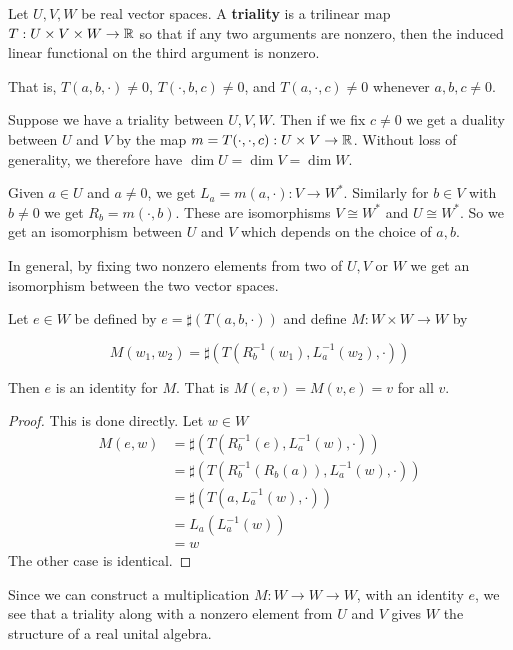 \begin{defn}[Triality]
    Let $U,V,W$ be real vector spaces. A \textbf{triality} is a trilinear map $T : U\times V\times W \to \operatorname{\mathbb{R}}$ so that if any two arguments are nonzero, then the induced linear functional on the third argument is nonzero.

    That is, $T(a,b,\cdot)\neq 0$, $T(\cdot,b,c)\neq 0$, and $T(a,\cdot,c)\neq 0$ whenever $a,b,c\neq 0$.
\end{defn}
\begin{remark*}
    Suppose we have a triality between $U,V,W$. Then if we fix $c\neq 0$ we get a duality between $U$ and $V$ by the map $m = T(\cdot,\cdot,c) : U\times V \to \operatorname{\mathbb{R}}$. Without loss of generality, we therefore have $\dim U = \dim V = \dim W$.
\end{remark*}
\begin{remark*}
    Given $a\in U$ and $a\neq 0$, we get $L_a = m(a,\cdot) : V\to W^*$. Similarly for $b\in V$ with $b\neq 0$ we get $R_b = m(\cdot,b)$. These are isomorphisms $V\cong W^*$ and $U\cong W^*$. So we get an isomorphism between $U$ and $V$ which depends on the choice of $a,b$.

    In general, by fixing two nonzero elements from two of $U,V$ or $W$ we get an isomorphism between the two vector spaces.
\end{remark*}
\begin{lemma}
    Let $e\in W$ be defined by $e = \sharp( T(a,b,\cdot))$ and define $M : W\times W \to W$ by 
    
    \[M(w_1,w_2) = \sharp( T(R_b^{-1}(w_1),L_a^{-1}(w_2),\cdot))\]

    Then $e$ is an identity for $M$. That is $M(e,v) = M(v,e) = v$ for all $v$.
\end{lemma}
\begin{proof}
This is done directly. Let $w\in W$
    \begin{align*}
        M(e,w) &= \sharp(T(R_b^{-1}(e),L_a^{-1}(w),\cdot))\\
        &= \sharp(T(R_b^{-1}(R_b(a)),L_a^{-1}(w),\cdot))\\
        &= \sharp(T(a,L_a^{-1}(w),\cdot))\\
        &= L_a(L_a^{-1}(w))\\
        &= w
    \end{align*}
    The other case is identical.
\end{proof}
\begin{remark*}
    Since we can construct a multiplication $M : W\to W\to W$, with an identity $e$, we see that a triality along with a nonzero element from $U$ and $V$ gives $W$ the structure of a real unital algebra.
\end{remark*}
